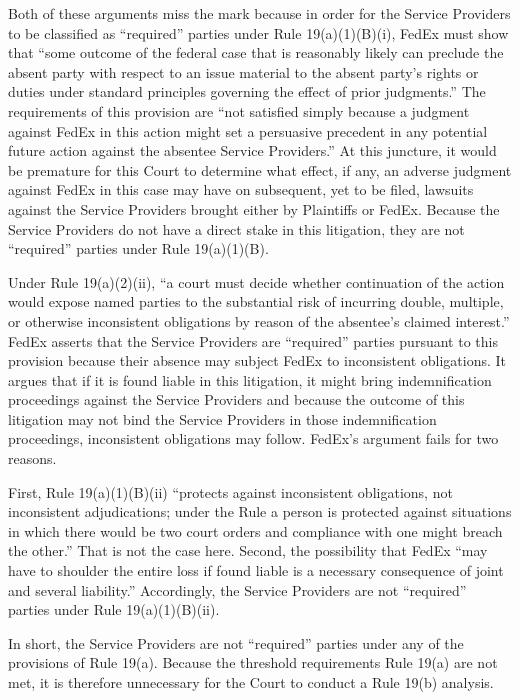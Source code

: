 \documentclass[11pt,letterpaper,twoside]{article}
\begin{document}
Both of these arguments miss the mark because in order for the Service
Providers to be classified as ``required'' parties under Rule
19(a)(1)(B)(i), FedEx must show that ``some outcome of the federal case
that is reasonably likely can preclude the absent party with respect to
an issue material to the absent party's rights or duties under standard
principles governing the effect of prior judgments.'' The requirements
of this provision are ``not satisfied simply because a judgment against
FedEx in this action might set a persuasive precedent in any potential
future action against the absentee Service Providers.'' At this
juncture, it would be premature for this Court to determine what effect,
if any, an adverse judgment against FedEx in this case may have on
subsequent, yet to be filed, lawsuits against the Service Providers
brought either by Plaintiffs or FedEx. Because the Service Providers do
not have a direct stake in this litigation, they are not ``required''
parties under Rule 19(a)(1)(B).

Under Rule 19(a)(2)(ii), ``a court must decide whether continuation of
the action would expose named parties to the substantial risk of
incurring double, multiple, or otherwise inconsistent obligations by
reason of the absentee's claimed interest.'' FedEx asserts that the
Service Providers are ``required'' parties pursuant to this provision
because their absence may subject FedEx to inconsistent obligations. It
argues that if it is found liable in this litigation, it might bring
indemnification proceedings against the Service Providers and because
the outcome of this litigation may not bind the Service Providers in
those indemnification proceedings, inconsistent obligations may follow.
FedEx's argument fails for two reasons.

First, Rule 19(a)(1)(B)(ii) ``protects against inconsistent obligations,
not inconsistent adjudications; under the Rule a person is protected
against situations in which there would be two court orders and
compliance with one might breach the other.'' That is not the case here.
Second, the possibility that FedEx ``may have to shoulder the entire
loss if found liable is a necessary consequence of joint and several
liability.'' Accordingly, the Service Providers are not ``required''
parties under Rule 19(a)(1)(B)(ii).

In short, the Service Providers are not ``required'' parties under any
of the provisions of Rule 19(a). Because the threshold requirements Rule
19(a) are not met, it is therefore unnecessary for the Court to conduct
a Rule 19(b) analysis.
\end{document}
